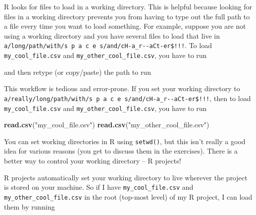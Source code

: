 \documentclass[
]{book}
\newenvironment{Shaded}{\begin{snugshade}}{\end{snugshade}}
\newcommand{\KeywordTok}[1]{\textcolor[rgb]{0.13,0.29,0.53}{\textbf{#1}}}
\newcommand{\NormalTok}[1]{#1}
\newcommand{\StringTok}[1]{\textcolor[rgb]{0.31,0.60,0.02}{#1}}
\begin{document}
R looks for files to load in a working directory. This is helpful because looking for files in a working directory prevents you from having to type out the full path to a file every time you want to load something. For example, suppose you are not using a working directory and you have several files to load that live in \texttt{a/long/path/with/s\ p\ a\ c\ e\ s/and/cH-a\_r-\/-aCt-er\$!!!}. To load \texttt{my\_cool\_file.csv} and \texttt{my\_other\_cool\_file.csv}, you have to run

\begin{Shaded}
\end{Shaded}

and then retype (or copy/paste) the path to run

\begin{Shaded}
\end{Shaded}

This workflow is tedious and error-prone. If you set your working directory to \texttt{a/really/long/path/with/s\ p\ a\ c\ e\ s/and/cH-a\_r-\/-aCt-er\$!!!}, then to load \texttt{my\_cool\_file.csv} and \texttt{my\_other\_cool\_file.csv}, you have to run

\begin{Shaded}
\begin{Highlighting}[]
\KeywordTok{read.csv}\NormalTok{(}\StringTok{"my_cool_file.csv"}\NormalTok{)}
\KeywordTok{read.csv}\NormalTok{(}\StringTok{"my_other_cool_file.csv"}\NormalTok{)}
\end{Highlighting}
\end{Shaded}

You can set working directories in R using \texttt{setwd()}, but this isn't really a good idea for various reasons (you get to discuss them in the exercises). There is a better way to control your working directory -- R projects!

R projects automatically set your working directory to live wherever the project is stored on your machine. So if I have \texttt{my\_cool\_file.csv} and \texttt{my\_other\_cool\_file.csv} in the root (top-most level) of my R project, I can load them by running
\end{document}
